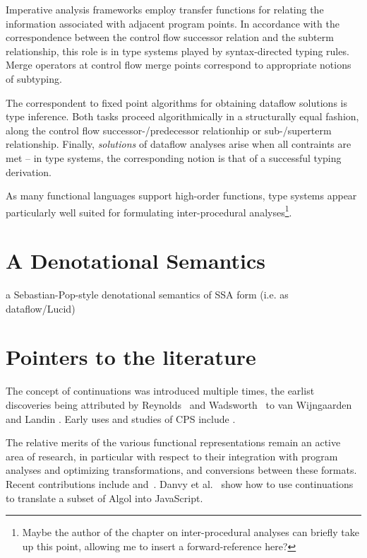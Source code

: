 Imperative analysis frameworks employ transfer functions for relating
the information associated with adjacent program points. In accordance
with the correspondence between the control flow successor relation and
the subterm relationship, this role is in type systems played by
syntax-directed typing rules. Merge operators at control flow merge
points correspond to appropriate notions of subtyping.

The correspondent to fixed point algorithms for obtaining dataflow
solutions is type inference. Both tasks proceed algorithmically in a
structurally equal fashion, along the control flow
successor-/predecessor relationhip or sub-/superterm relationship.
Finally, \emph{solutions} of dataflow analyses arise when
all contraints are met -- in type systems, the corresponding notion is
that of a successful typing derivation.

As many functional languages support high-order functions, type
systems appear particularly well suited for formulating
inter-procedural analyses\footnote{Maybe the author of the chapter on
inter-procedural analyses can briefly take up this point, allowing me
to insert a forward-reference here?}.


\section{A Denotational Semantics}
\label{section:Part1:Semantics:PopSemantics}

a Sebastian-Pop-style denotational semantics of SSA form (i.e. as
dataflow/Lucid)



\section{Pointers to the literature}
\label{section:Part1:Semantics:Discussion}

The concept of continuations was introduced multiple times, the
earlist discoveries being attributed by
Reynolds~\cite{Reynolds:LSC1993} and Wadsworth~\cite{Wadsworth00} to
van Wijngaarden
\cite{vanWijngaarden1966} and Landin \cite{Landin1965}. Early uses
and studies of CPS include \cite{Reynolds:1972,Plotkin75}.  

The relative merits of the various functional representations remain
an active area of research, in particular with respect to their
integration with program analyses and optimizing transformations, and
conversions between these formats. Recent contributions include
\cite{DBLP:journals/jfp/DanvyMN07} and~\cite{DBLP:journals/lisp/Reppy02}. 
Danvy et al.~\cite{DBLP:conf/dsl/DanvySZ09} show how to use
continuations to translate a subset of Algol into JavaScript.

